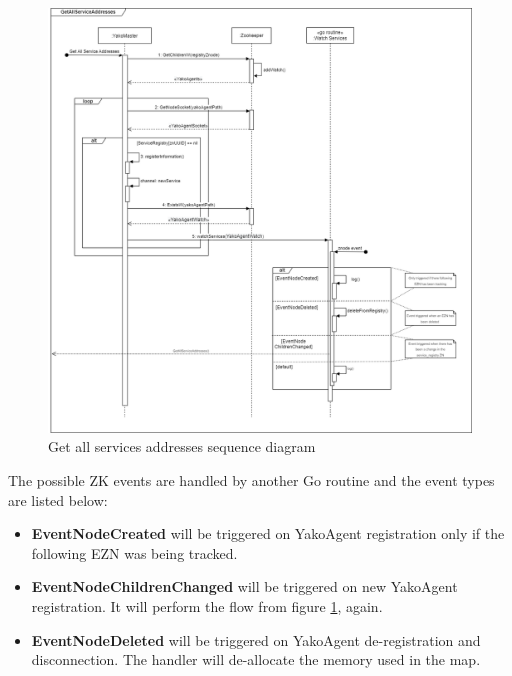             \begin{figure}[H]
                \centering
                \includegraphics[width=\linewidth]{Images/Backend/GetAllServicesAddresses SD.png}
                \caption{Get all services addresses sequence diagram}
                \label{fig:services_addresses_sd}
            \end{figure}
            
            The possible ZK events are handled by another Go routine and the event types are listed below:
            
            \begin{itemize}
                \item \textbf{EventNodeCreated} will be triggered on YakoAgent registration only if the following EZN was being tracked.
                \item \textbf{EventNodeChildrenChanged} will be triggered on new YakoAgent registration. It will perform the flow from figure \ref{fig:services_addresses_sd}, again.
                \item \textbf{EventNodeDeleted} will be triggered on YakoAgent de-registration and disconnection. The handler will de-allocate the memory used in the map.
            \end{itemize}
        
